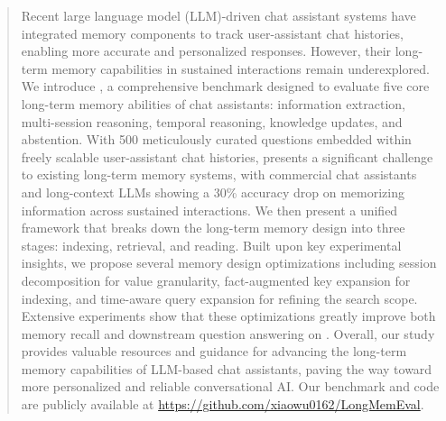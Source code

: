 \begin{abstract}

Recent large language model (LLM)-driven chat assistant systems have integrated memory components to track user-assistant chat histories, enabling more accurate and personalized responses. However, their long-term memory capabilities in sustained interactions remain underexplored. We introduce \BENCHMARK{}, a comprehensive benchmark designed to evaluate five core long-term memory abilities of chat assistants: information extraction, multi-session reasoning, temporal reasoning, knowledge updates, and abstention. With 500 meticulously curated questions embedded within freely scalable user-assistant chat histories, \BENCHMARK{} presents a significant challenge to existing long-term memory systems, with commercial chat assistants and long-context LLMs showing a 30\% accuracy drop on memorizing information across sustained interactions. We then present a unified framework that breaks down the long-term memory design into three stages: indexing, retrieval, and reading. Built upon key experimental insights, we propose several memory design optimizations including session decomposition for value granularity, fact-augmented key expansion for indexing, and time-aware query expansion for refining the search scope. Extensive experiments show that these optimizations greatly improve both memory recall and downstream question answering on \BENCHMARK{}. Overall, our study provides valuable resources and guidance for advancing the long-term memory capabilities of LLM-based chat assistants, paving the way toward more personalized and reliable conversational AI. Our benchmark and code are publicly available at \url{https://github.com/xiaowu0162/LongMemEval}.

\end{abstract}